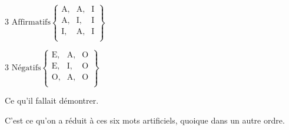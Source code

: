 \begin{center}
$ \text {3 Affirmatifs} \left \{
    \begin{array}{ccc}
	    \text {A,} & \text{A,} & \text{I} \\
  	    \text {A,} & \text{I,} & \text{I} \\
  	    \text {I,} & \text{A,} & \text{I} \\
    \end{array}
	    \right \} $
\end{center}
\begin{center}
$ \text {3 Négatifs} \left \{
    \begin{array}{ccc}
	    \text {E,} & \text{A,} & \text{O} \\
	    \text {E,} & \text{I,} & \text{O} \\
	    \text {O,} & \text{A,} & \text{O} \\
    \end{array}
	    \right \} $
\end{center}

Ce qu'il fallait démontrer.

C'est ce qu'on a réduit à ces six mots artificiels, quoique dans un autre ordre.

